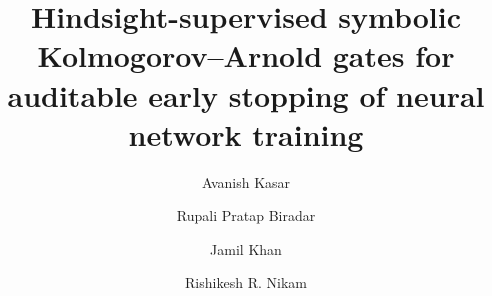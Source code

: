\documentclass[preprint,12pt]{elsarticle}
\begin{document}
\begin{frontmatter}

\title{Hindsight-supervised symbolic Kolmogorov--Arnold gates for auditable early stopping of neural network training}

\author[apsit]{Avanish Kasar}
\author[apsit]{Rupali Pratap Biradar}
\author[apsit]{Jamil Khan}
\author[apsit]{Rishikesh R. Nikam}



\end{frontmatter}










\end{document}
